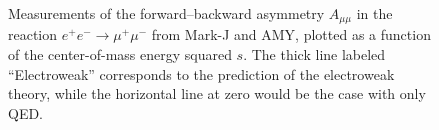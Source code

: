 \documentclass[a4paper,10pt]{article}
\begin{document}
\begin{figure}[htb]
\begin{center}

\caption{Measurements of the forward--backward asymmetry $A_{\mu\mu}$ in the reaction $e^+e^-\rightarrow\mu^+\mu^-$
from Mark-J and
AMY,
plotted as a function of the center-of-mass energy squared $s$. The thick line labeled ``Electroweak'' corresponds to the prediction of the electroweak theory, while
the horizontal line at zero would be the case with only QED. }
\end{center}
\end{figure}
%
\vskip 5cm
\doclicenseThis
\end{document}
